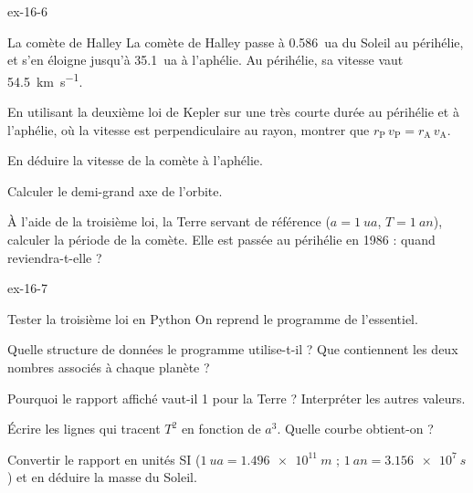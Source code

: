 \begin{blocLivre}{ex-16-6}
\begin{exercice}[2]{La comète de Halley}
La comète de Halley passe à \qty{0,586}{ua} du Soleil au périhélie, et s'en éloigne jusqu'à \qty{35,1}{ua} à l'aphélie. Au
périhélie, sa vitesse vaut \qty{54,5}{km.s^{-1}}.
\begin{questions}
\item En utilisant la deuxième loi de Kepler sur une très courte durée au périhélie et à l'aphélie, où la vitesse est
perpendiculaire au rayon, montrer que $r_\mathrm{P}\,v_\mathrm{P}=r_\mathrm{A}\,v_\mathrm{A}$.
\item En déduire la vitesse de la comète à l'aphélie.
\item Calculer le demi-grand axe de l'orbite.
\item À l'aide de la troisième loi, la Terre servant de référence ($a=\qty{1}{ua}$, $T=\qty{1}{an}$), calculer la période de la
comète. Elle est passée au périhélie en 1986 : quand reviendra-t-elle ?
\end{questions}
\end{exercice}
\end{blocLivre}
\begin{blocLivre}{ex-16-7}
\begin{exercice}[2]{Tester la troisième loi en Python}
On reprend le programme de l'essentiel.
\begin{questions}
\item {}Quelle structure de données le programme utilise-t-il ? Que contiennent les deux nombres
associés à chaque planète ?
\item Pourquoi le rapport affiché vaut-il 1 pour la Terre ? Interpréter les autres valeurs.
\item Écrire les lignes qui tracent $T^2$ en fonction de $a^3$. Quelle courbe obtient-on ?
\item Convertir le rapport en unités SI ($\qty{1}{ua}=\qty{1,496e11}{m}$ ; $\qty{1}{an}=\qty{3,156e7}{s}$) et en déduire la masse du
Soleil.
\end{questions}
\end{exercice}
\end{blocLivre}
